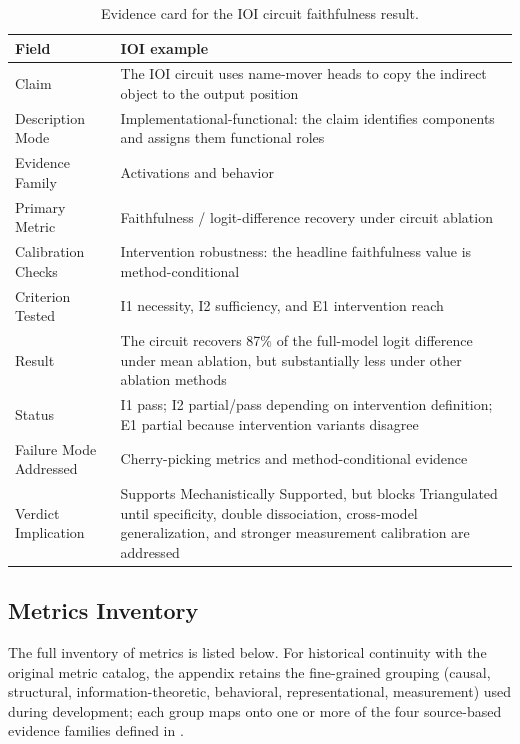 \documentclass{article}
\begin{document}
\begin{table}[H]
\centering
\small
\caption{Evidence card for the IOI circuit faithfulness result.}
\renewcommand{\arraystretch}{1.2}
\begin{tabular}{@{}lp{10cm}@{}}
\toprule
\textbf{Field} & \textbf{IOI example} \\
\midrule
Claim & The IOI circuit uses name-mover heads to copy the indirect object to the output position \\
\midrule
Description Mode & Implementational-functional: the claim identifies components and assigns them functional roles \\
\midrule
Evidence Family & Activations and behavior \\
\midrule
Primary Metric & Faithfulness / logit-difference recovery under circuit ablation \\
\midrule
Calibration Checks & Intervention robustness: the headline faithfulness value is method-conditional \\
\midrule
Criterion Tested & I1 necessity, I2 sufficiency, and E1 intervention reach \\
\midrule
Result & The circuit recovers 87\% of the full-model logit difference under mean ablation, but substantially less under other ablation methods \\
\midrule
Status & I1 pass; I2 partial/pass depending on intervention definition; E1 partial because intervention variants disagree \\
\midrule
Failure Mode Addressed & Cherry-picking metrics and method-conditional evidence \\
\midrule
Verdict Implication & Supports Mechanistically Supported, but blocks Triangulated until specificity, double dissociation, cross-model generalization, and stronger measurement calibration are addressed \\
\bottomrule
\end{tabular}
\label{tabevidencecardioi}
\end{table}




\subsection{Metrics Inventory}
\label{appendix:metrics}
The full inventory of metrics is listed below. For historical continuity with the original metric catalog, the appendix retains the fine-grained grouping (causal, structural, information-theoretic, behavioral, representational, measurement) used during development; each group maps onto one or more of the four source-based evidence families defined in . \\
\\
\begingroup
\small
\setlength{\tabcolsep}{4pt}
\renewcommand{\arraystretch}{1.15}
\end{document}
